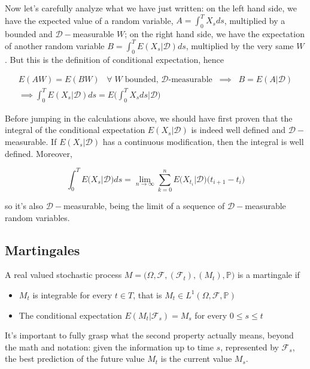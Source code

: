 Now let's carefully analyze what we have just written: on the left hand side, we have the expected value of a random variable, $A = \int_0^T X_s ds$, multiplied by a bounded and $\mathcal{D}-$measurable $W$; on the right hand side, we have the expectation of another random variable $B = \int_0^T E(X_s \vert \mathcal{D}) ds$, multiplied by the very same $W$. But this is the definition of conditional expectation, hence

\begin{gather*}
    E(A W) = E(B W) \;\;\; \forall \; W \; \text{bounded, $\mathcal{D}$-measurable} \;\; \implies \;\; B = E(A \vert \mathcal{D}) \\
    \implies \int_0^T E(X_s \vert \mathcal{D}) ds = E\Bigg( \int_0^T X_s ds \Big\vert \mathcal{D}\Bigg)
\end{gather*}

Before jumping in the calculations above, we should have first proven that the integral of the conditional expectation $E(X_s \vert \mathcal{D})$ is indeed well defined and $\mathcal{D}-$measurable. If $E(X_s \vert \mathcal{D})$ has a continuous modification, then the integral is well defined. Moreover,

\begin{equation*}
    \int_0^T E\big(X_s \vert \mathcal{D} \big) ds = \lim_{n \to \infty} \sum_{k=0}^n E\big(X_{t_i} \vert \mathcal{D}\big) \big( t_{i+1}-t_i \big)
\end{equation*}

so it's also $\mathcal{D}-$measurable, being the limit of a sequence of $\mathcal{D}-$measurable random variables. 

\subsection{Martingales}
\begin{definition}
    A real valued stochastic process $M = \big( \Omega, \mathcal{F}, (\mathcal{F}_t), (M_t), \mathbb{P} \big)$ is a martingale if 
    \begin{itemize}
        \item $M_t$ is integrable for every $t \in T$, that is $M_t \in L^1(\Omega,\mathcal{F},\mathbb{P})$
        \item The conditional expectation $E(M_t \vert \mathcal{F}_s) = M_s$ for every $0 \leq s \leq t$
    \end{itemize}
\end{definition}

It's important to fully grasp what the second property actually means, beyond the math and notation: given the information up to time $s$, represented by $\mathcal{F}_s$, the best prediction of the future value $M_t$ is the current value $M_s$. 

